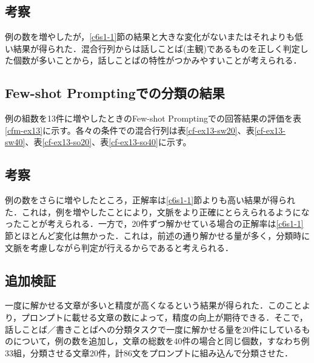 \subsection{考察}
例の数を増やしたが，\ref{c6s1-1}節の結果と大きな変化がないまたはそれよりも低い結果が得られた．混合行列からは話しことば(主観)であるものを正しく判定した個数が多いことから，話しことばの特性がつかみやすいことが考えられる．

\subsection{Few-shot Promptingでの分類の結果 \label{c6s1-3}}
例の組数を13件に増やしたときのFew-shot Promptingでの回答結果の評価を表\ref{cfm-ex13}に示す。各々の条件での混合行列は表\ref{cf-ex13-sw20}、表\ref{cf-ex13-sw40}、表\ref{cf-ex13-so20}、表\ref{cf-ex13-so40}に示す。







\subsection{考察}
例の数をさらに増やしたところ，正解率は\ref{c6s1-1}節よりも高い結果が得られた．これは，例を増やしたことにより，文脈をより正確にとらえられるようになったことが考えられる．一方で，20件ずつ解かせている場合の正解率は\ref{c6s1-1}節とほとんど変化は無かった．これは，前述の通り解かせる量が多く，分類時に文脈を考慮しながら判定が行えるからであると考えられる．

\subsection{追加検証}
一度に解かせる文章が多いと精度が高くなるという結果が得られた．このことより，プロンプトに載せる文章の数によって，精度の向上が期待できる．そこで，話しことば／書きことばへの分類タスクで一度に解かせる量を20件にしているものについて，例の数を追加し，文章の総数を40件の場合と同じ個数，すなわち例33組，分類させる文章20件，計86文をプロンプトに組み込んで分類させた．